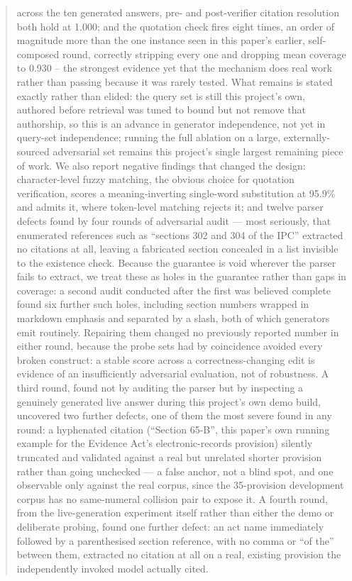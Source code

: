\documentclass[conference]{IEEEtran}
\begin{document}
\begin{abstract}
across the ten generated answers, pre- and post-verifier citation resolution both hold at 1.000; and the quotation check fires eight times, an order of magnitude more than the one instance seen in this paper's earlier, self-composed round, correctly stripping every one and dropping mean coverage to 0.930 -- the strongest evidence yet that the mechanism does real work rather than passing because it was rarely tested. What remains is stated exactly rather than elided: the query set is still this project's own, authored before retrieval was tuned to bound but not remove that authorship, so this is an advance in generator independence, not yet in query-set independence; running the full ablation on a large, externally-sourced adversarial set remains this project's single largest remaining piece of work. We also report negative findings that changed the design: character-level fuzzy matching, the obvious choice for quotation verification, scores a meaning-inverting single-word substitution at 95.9\% and admits it, where token-level matching rejects it; and twelve parser defects found by four rounds of adversarial audit --- most seriously, that enumerated references such as ``sections 302 and 304 of the IPC'' extracted no citations at all, leaving a fabricated section concealed in a list invisible to the existence check. Because the guarantee is void wherever the parser fails to extract, we treat these as holes in the guarantee rather than gaps in coverage: a second audit conducted after the first was believed complete found six further such holes, including section numbers wrapped in markdown emphasis and separated by a slash, both of which generators emit routinely. Repairing them changed no previously reported number in either round, because the probe sets had by coincidence avoided every broken construct: a stable score across a correctness-changing edit is evidence of an insufficiently adversarial evaluation, not of robustness. A third round, found not by auditing the parser but by inspecting a genuinely generated live answer during this project's own demo build, uncovered two further defects, one of them the most severe found in any round: a hyphenated citation (``Section 65-B'', this paper's own running example for the Evidence Act's electronic-records provision) silently truncated and validated against a real but unrelated shorter provision rather than going unchecked --- a false anchor, not a blind spot, and one observable only against the real corpus, since the 35-provision development corpus has no same-numeral collision pair to expose it. A fourth round, from the live-generation experiment itself rather than either the demo or deliberate probing, found one further defect: an act name immediately followed by a parenthesised section reference, with no comma or ``of the'' between them, extracted no citation at all on a real, existing provision the independently invoked model actually cited.
\end{abstract}
\end{document}
